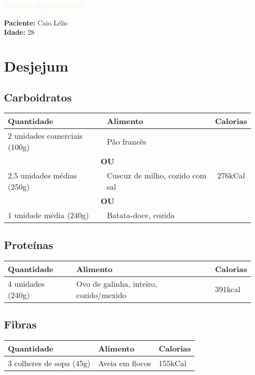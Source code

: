 \begin{center}
    \LARGE{\textcolor{beige}{\textbf{PLANO ALIMENTAR}}}
\end{center}

\vspace{1cm}

\large{\textbf{Paciente:} Caio Lélis} \\
\textbf{Idade:} 28

\section*{Desjejum}

\subsection*{Carboidratos}

\begin{tabular}{p{8cm}p{8cm}c}
\toprule
\textbf{Quantidade} & \textbf{Alimento} & \textbf{Calorias} \\
\midrule
2 unidades comerciais (100g) & Pão francês & \multirow{6}{*}{276kCal} \\
\cmidrule(lr){1-2}
\multicolumn{2}{c}{\textbf{OU}} \\
\cmidrule(lr){1-2}
2,5 unidades médias (250g) & Cuscuz de milho, cozido com sal \\
\cmidrule(lr){1-2}
\multicolumn{2}{c}{\textbf{OU}} \\
\cmidrule(lr){1-2}
1 unidade média (240g) & Batata-doce, cozida \\
\bottomrule
\end{tabular}

\subsection*{Proteínas}

\begin{tabular}{p{8cm}p{8cm}p{1.5cm}}
\toprule
\textbf{Quantidade} & \textbf{Alimento} & \textbf{Calorias} \\
\midrule
4 unidades (240g) & Ovo de galinha, inteiro, cozido/mexido & 391kcal \\
\bottomrule
\end{tabular}

\subsection*{Fibras}

\begin{tabular}{p{8cm}p{8cm}p{1.5cm}}
\toprule
\textbf{Quantidade} & \textbf{Alimento} & \textbf{Calorias} \\
\midrule
3 colheres de sopa (45g) & Aveia em flocos & 155kCal \\
\bottomrule
\end{tabular}

